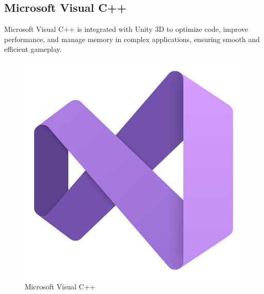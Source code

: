\subsection{Microsoft Visual C++}
Microsoft Visual C++ is integrated with Unity 3D to optimize code, improve performance, and manage memory in complex applications, ensuring smooth and efficient gameplay.
\begin{figure}[h]
	\centering
	\includegraphics[width=0.2\linewidth,height=0.2\linewidth]{Images/VS Code.png}
	\caption{Microsoft Visual C++\cite{visual-studio-icon}}
\end{figure}